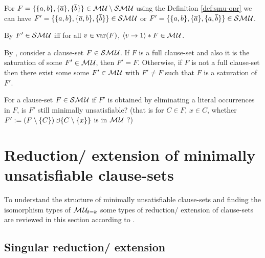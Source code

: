 \documentclass{report}
\begin{document}
\begin{examp}\label{exp:smu-exp}
 For $F = \{ \{ a,b \},\{ \overline{a} \},\{ \overline{b} \} \} \in \mathcal{M\hspace{0.8pt}U} \setminus \mathcal{S}\mathcal{M\hspace{0.8pt}U}$ using the Definition \ref{def:smu-opr} we can have $F'=\{ \{ a,b \},\{ \overline{a},b \},\{ \overline{b} \} \} \in \mathcal{S}\mathcal{M\hspace{0.8pt}U}$ or $F'=\{ \{ a,b \},\{ \overline{a} \},\{ a,\overline{b} \} \} \in \mathcal{S}\mathcal{M\hspace{0.8pt}U}$.
\end{examp}

\begin{lem}\label{lem:smu-mu}
By \cite{KullmannZhao2010Extremal}  $F' \in \mathcal{S}\mathcal{M\hspace{0.8pt}U}$ iff for all $v \in \operatorname{var}(F)$, $\langle v \rightarrow 1 \rangle*F \in \mathcal{M\hspace{0.8pt}U}$.
\end{lem}

\begin{lem}\label{lem:smu-app}
By \cite{KullmannZhao2010Extremal}, consider a clause-set $F \in \mathcal{S}\mathcal{M\hspace{0.8pt}U}$. If $F$ is a full clause-set and also it is the saturation of some $F' \in \mathcal{M\hspace{0.8pt}U}$, then $F' = F$. Otherwise, if $F$ is not a full clause-set then there exist some some $F' \in \mathcal{M\hspace{0.8pt}U}$ with $F' \not= F$ such that $F$ is a saturation of $F'$.
\end{lem}

\begin{quest}\label{que:smu-elim}
For a clause-set $F \in \mathcal{S}\mathcal{M\hspace{0.8pt}U}$ if $F'$ is obtained by eliminating a literal occurrences in $F$, is $F'$ still minimally unsatisfiable? (that is for $C \in F$, $x \in C$, whether $F' := (F \sm \set{C}) \addcup \set{C \sm \set{x}}$ is in $\mathcal{M\hspace{0.8pt}U}$ ?)
\end{quest}
\section{Reduction/ extension of minimally unsatisfiable clause-sets}
\label{sec:r-e}

To understand the structure of minimally unsatisfiable clause-sets and finding the isomorphism types of $\mathcal{M\hspace{0.8pt}U}_{\!\delta=k}$ some types of reduction/ extension of clause-sets are reviewed in this section according to \cite{KullmannZhao2010Extremal,KullmannZhao2012ConfluenceJ}.

\subsection{Singular reduction/ extension}
\label{sec:sing-re} 
\end{document}
